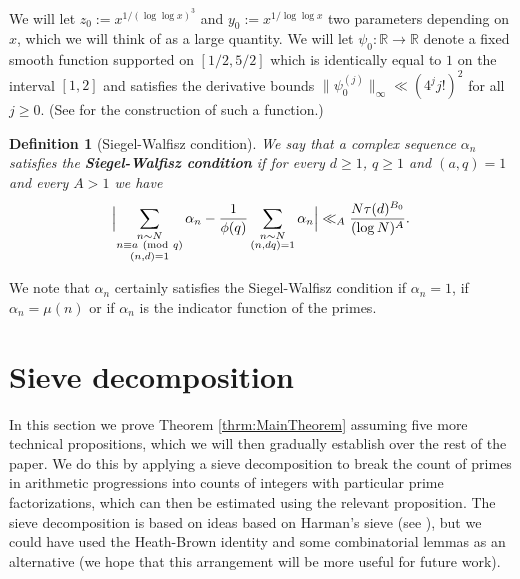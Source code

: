 \documentclass[10pt]{amsart}
\theoremstyle{plain}
\newtheorem{dfntn}{Definition}
\numberwithin{equation}{section}
\newcommand{\Mod}[1]{\ (\mathrm{mod}\ #1)}
\begin{document}
We will let $z_0:=x^{1/(\log\log{x})^3}$ and $y_0:=x^{1/\log\log{x}}$ two parameters depending on $x$, which we will think of as a large quantity. We will let $\psi_0:\mathbb{R}\rightarrow\mathbb{R}$ denote a fixed smooth function supported on $[1/2,5/2]$ which is identically equal to $1$ on the interval $[1,2]$ and satisfies the derivative bounds $\|\psi_0^{(j)}\|_\infty\ll (4^j j!)^2$ for all $j\ge 0$. (See \cite[Page 368, Corollary]{BFI2} for the construction of such a function.)
%
%
%
%
%
%
%
%
\begin{dfntn}[Siegel-Walfisz condition]
We say that a complex sequence $\alpha_n$ satisfies the \textbf{Siegel-Walfisz condition} if for every $d\ge 1$, $q\ge 1$ and $(a,q)=1$ and every $A>1$ we have
\begin{equation}
\Bigl|\sum_{\substack{n\sim N\\ n\equiv a\Mod{q}\\ (n,d)=1}}\alpha_n-\frac{1}{\phi(q)}\sum_{\substack{n\sim N\\ (n,d q)=1}}\alpha_n\Bigr|\ll_A \frac{N\tau(d)^{B_0}}{(\log{N})^A}.
\label{eq:SiegelWalfisz}
\end{equation}
\end{dfntn}
%
%
%
%
%
%
%
%
We note that $\alpha_n$ certainly satisfies the Siegel-Walfisz condition if $\alpha_n=1$, if $\alpha_n=\mu(n)$ or if $\alpha_n$ is the indicator function of the primes.
%
%
%
%
%
%
%
%
%
%
%
%
%
%
%
%
%
%
%
%
\section{Sieve decomposition}\label{sec:Decomposition}
%
%
%
%
In this section we prove Theorem \ref{thrm:MainTheorem} assuming five more technical propositions, which we will then gradually establish over the rest of the paper. We do this by applying a sieve decomposition to break the count of primes in arithmetic progressions into counts of integers with particular prime factorizations, which can then be estimated using the relevant proposition. The sieve decomposition is based on ideas based on Harman's sieve (see \cite{Harman}), but we could have used the Heath-Brown identity and some combinatorial lemmas as an alternative (we hope that this arrangement will be more useful for future work).
\end{document}
